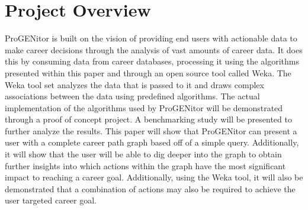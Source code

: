 \section{Project Overview}
\label{sect:project-overview}
ProGENitor is built on the vision of providing end users with actionable
data to make career decisions through the analysis of vast amounts of career
data.  It does this by consuming data from career databases, processing it using
the algorithms presented within this paper and through an open source tool called
Weka.  The Weka tool set analyzes the data that is passed to it and draws
complex associations between the data using predefined algorithms.  The actual
implementation of the algorithms used by ProGENitor will be demonstrated through
a proof of concept project.  A benchmarking study will be presented to
further analyze the results.  This paper will show that ProGENitor can present a user with a
complete career path graph based off of a simple query.  Additionally, it
will show that the user will be able to dig deeper into the graph to obtain
further insights into which actions within the graph have the most significant
impact to reaching a career goal.  Additionally, using the Weka tool, it will
also be demonstrated that a combination of actions may also be required to
achieve the user targeted career goal.

